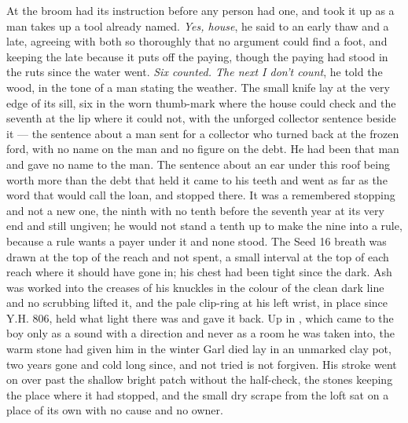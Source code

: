 \scenebreak

At  the broom had its instruction before any person had one, and  took it up as a man takes up a tool already named. \emph{Yes, house}, he said to an early thaw and a late, agreeing with both so thoroughly that no argument could find a foot, and keeping the late because it puts off the paying, though the paying had stood in the ruts since the water went. \emph{Six counted. The next I don't count}, he told the wood, in the tone of a man stating the weather. The small knife lay at the very edge of its sill, six in the worn thumb-mark where the house could check and the seventh at the lip where it could not, with the unforged collector sentence beside it --- the sentence about a man sent for a collector who turned back at the frozen ford, with no name on the man and no figure on the debt. He had been that man and gave no name to the man. The sentence about an ear under this roof being worth more than the debt that held it came to his teeth and went as far as the word that would call the loan, and stopped there. It was a remembered stopping and not a new one, the ninth with no tenth before the seventh year at its very end and still ungiven; he would not stand a tenth up to make the nine into a rule, because a rule wants a payer under it and none stood. The Seed 16 breath was drawn at the top of the reach and not spent, a small interval at the top of each reach where it should have gone in; his chest had been tight since the dark. Ash was worked into the creases of his knuckles in the colour of the clean dark line and no scrubbing lifted it, and the pale clip-ring at his left wrist, in place since Y.H. 806, held what light there was and gave it back. Up in , which came to the boy only as a sound with a direction and never as a room he was taken into, the warm stone  had given him in the winter Garl died lay in an unmarked clay pot, two years gone and cold long since, and not tried is not forgiven. His stroke went on over  past the shallow bright patch without the half-check, the stones keeping the place where it had stopped, and the small dry scrape from the loft sat on a place of its own with no cause and no owner.

